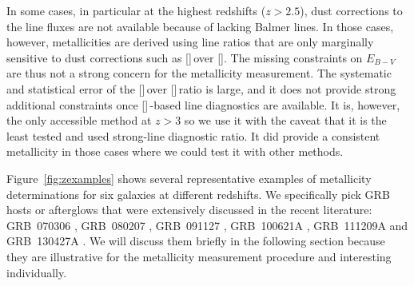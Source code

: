 \documentclass[traditabstract, longauth]{aa}
\newcommand{\oii}{[\ion{O}{ii}]}
\newcommand{\neiii}{[\ion{Ne}{iii}]}
\newcommand{\nii}{[\ion{N}{ii}]}
\begin{document}
\begin{appendix}
In some cases, in particular at the highest redshifts ($z>2.5$), dust corrections to the line fluxes are not available because of lacking Balmer lines. In those cases, however, metallicities are derived using line ratios that are only marginally sensitive to dust corrections such as \neiii\,over \oii. The missing constraints on $E_{B-V}$ are thus not a strong concern for the metallicity measurement. The systematic and statistical error of the \neiii\,over \oii\,ratio is large, and it does not provide strong additional constraints once \nii\,-based line diagnostics are available. It is, however, the only accessible method at $z>3$ so we use it with the caveat that it is the least tested and used strong-line diagnostic ratio. It did provide a consistent metallicity in those cases where we could test it with other methods.

Figure~\ref{fig:zexamples} shows several representative examples of metallicity determinations for six galaxies at different redshifts. We specifically pick GRB hosts or afterglows that were extensively discussed in the recent literature: GRB~070306 \citep{2008ApJ...681..453J, 2011A&A...534A.108K}, GRB~080207 \citep{2011ApJ...736L..36H, 2012MNRAS.421...25S, }, GRB~091127 \citep{2011A&A...535A.127V}, GRB~100621A \citep{2013A&A...560A..70G}, GRB~111209A \citep{2013ApJ...766...30G, 2014ApJ...781...13L, 2015Greinersubm, 2015Kannsubm} and GRB~130427A \citep[e.g.,][]{2013ApJ...776...98X, 2014ApJ...781...37P}. We will discuss them briefly in the following section because they are illustrative for the metallicity measurement procedure and interesting individually.


\end{appendix}
\end{document}
